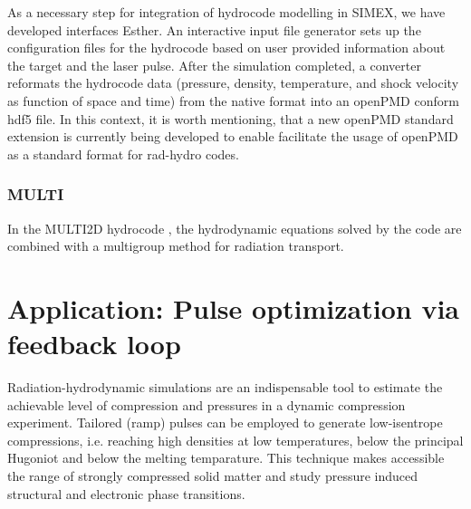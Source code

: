 \documentclass[12pt]{scrartcl}
\begin{document}
As a necessary step for integration of hydrocode modelling in SIMEX, we have
developed interfaces Esther. An interactive input file generator sets up
the configuration files for the hydrocode based on user provided information
about the target and the laser pulse. After the simulation completed, a
converter reformats the hydrocode data (pressure, density, temperature, and
shock velocity as function of space and time) from the native format into an
openPMD conform hdf5 file. In this context, it is worth mentioning, that a new
openPMD standard extension is currently being developed to enable facilitate the
usage of openPMD as a standard format for rad-hydro codes.

\subsubsection{MULTI}
In the MULTI2D hydrocode \cite{Ramis2009},
the hydrodynamic equations solved by the code are combined with a multigroup method for radiation transport.



\section{Application: Pulse optimization via feedback loop}
Radiation-hydrodynamic simulations are an indispensable tool to estimate the
achievable level of compression and pressures in a dynamic compression
experiment. Tailored (ramp) pulses can be employed to generate low-isentrope
compressions, i.e. reaching high densities at low temperatures, below the
principal Hugoniot and below the melting temparature. This technique makes
accessible the range of strongly compressed solid matter and study pressure
induced structural and electronic phase transitions.
\end{document}
